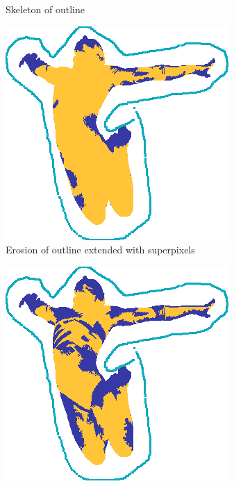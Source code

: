 \begin{figure}[h!]
\begin{subfigure}[b]{0.49\columnwidth}
    \caption{Skeleton of outline}%
    \label{fig:outlineSkel}
\end{subfigure}
\begin{subfigure}[b]{0.49\columnwidth}
    \includegraphics[width=\textwidth]{assets/img/outlineErodedSP.png}
    \caption{Erosion of outline extended with superpixels}%
    \label{fig:outlineErodedSP}
\end{subfigure}
\hfill
\begin{subfigure}[b]{0.49\columnwidth}
    \includegraphics[width=\textwidth]{assets/img/outlineSkelSP.png}

\end{subfigure}
\end{figure}
